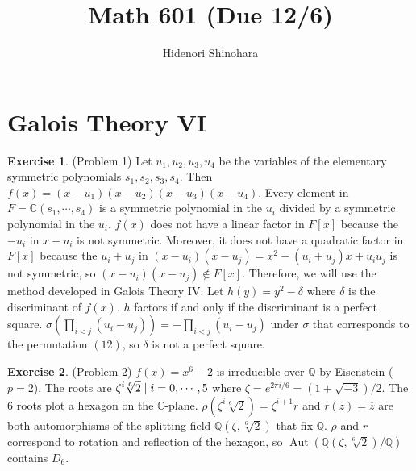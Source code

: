 \documentclass[12pt, psamsfonts]{amsart}
\theoremstyle{definition}
\newtheorem*{exer}{Exercise}
\theoremstyle{remark}
\DeclareMathOperator{\Aut}{Aut}
\numberwithin{equation}{section}
\begin{document}
\title{Math 601 (Due 12/6)}
\author{Hidenori Shinohara}
\maketitle

\tableofcontents

\section{Galois Theory VI}

\begin{exer}{(Problem 1)}
  Let $u_1, u_2, u_3, u_4$ be the variables of the elementary symmetric polynomials $s_1, s_2, s_3, s_4$.
  Then $f(x) = (x - u_1)(x - u_2)(x - u_3)(x - u_4)$.
  Every element in $F = \mathbb{C}(s_1, \cdots, s_4)$ is a symmetric polynomial in the $u_i$ divided by a symmetric polynomial in the $u_i$.
  $f(x)$ does not have a linear factor in $F[x]$ because the $-u_i$ in $x - u_i$ is not symmetric.
  Moreover, it does not have a quadratic factor in $F[x]$ because the $u_i + u_j$ in $(x - u_i)(x - u_j) = x^2 - (u_i + u_j)x + u_iu_j$ is not symmetric, so $(x - u_i)(x - u_j) \notin F[x]$.
  Therefore, we will use the method developed in Galois Theory IV.
  Let $h(y) = y^2 - \delta$ where $\delta$ is the discriminant of $f(x)$.
  $h$ factors if and only if the discriminant is a perfect square.
  $\sigma(\prod_{i < j} (u_i - u_j)) = -\prod_{i < j} (u_i - u_j)$ under $\sigma$ that corresponds to the permutation $(12)$, so $\delta$ is not a perfect square.

\end{exer}

\begin{exer}{(Problem 2)}
  $f(x) = x^6 - 2$ is irreducible over $\mathbb{Q}$ by Eisenstein ($p = 2$).
  The roots are $\\{ \zeta^{i} \sqrt[6]{2} \mid i = 0, \cdots, 5 \\}$ where $\zeta = e^{2\pi i / 6} = (1 + \sqrt{-3}) / 2$.
  The 6 roots plot a hexagon on the $\mathbb{C}$-plane.
  $\rho(\zeta^{i}\sqrt[6]{2}) = \zeta^{i + 1} r$ and $r(z) = \overline{z}$ are both automorphisms of the splitting field $\mathbb{Q}(\zeta, \sqrt[6]{2})$ that fix $\mathbb{Q}$.
  $\rho$ and $r$ correspond to rotation and reflection of the hexagon, so $\Aut(\mathbb{Q}(\zeta, \sqrt[6]{2})/\mathbb{Q})$ contains $D_6$.

\end{exer}
\end{document}
